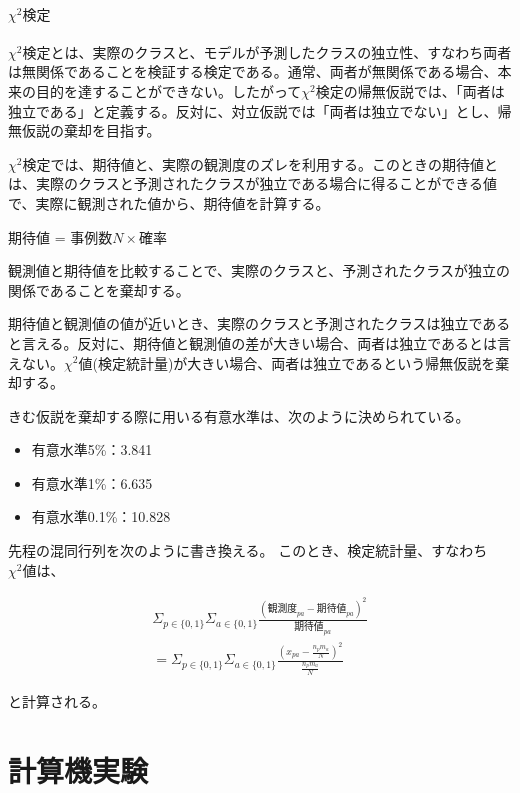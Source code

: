 \documentclass[dvipdfmx]{jsarticle}
\begin{document}
\paragraph{$χ^{2}検定$} \par
$χ^{2}検定$とは、実際のクラスと、モデルが予測したクラスの独立性、すなわち両者は無関係であることを検証する検定である。通常、両者が無関係である場合、本来の目的を達することができない。したがって$χ^{2}検定$の帰無仮説では、「両者は独立である」と定義する。反対に、対立仮説では「両者は独立でない」とし、帰無仮説の棄却を目指す。\par
$χ^{2}検定$では、期待値と、実際の観測度のズレを利用する。このときの期待値とは、実際のクラスと予測されたクラスが独立である場合に得ることができる値で、実際に観測された値から、期待値を計算する。
\begin{center}
  期待値 = 事例数$N\times$確率
\end{center}
観測値と期待値を比較することで、実際のクラスと、予測されたクラスが独立の関係であることを棄却する。\par
期待値と観測値の値が近いとき、実際のクラスと予測されたクラスは独立であると言える。反対に、期待値と観測値の差が大きい場合、両者は独立であるとは言えない。$χ^{2}値$(検定統計量)が大きい場合、両者は独立であるという帰無仮説を棄却する。\par
きむ仮説を棄却する際に用いる有意水準は、次のように決められている。
\begin{itemize}
  \item 有意水準5\%：3.841
  \item 有意水準1\%：6.635
  \item 有意水準0.1\%：10.828
\end{itemize}
先程の混同行列を次のように書き換える。
このとき、検定統計量、すなわち$χ^{2}値$は、
\begin{center}
  \begin{align*}
    \Sigma_{p \in \{0,1\}}\Sigma_{a \in \{0,1\}}\frac{(観測度_{pa}-期待値_{pa})^{2}}{期待値_{pa}}　\\
     = \Sigma_{p \in \{0,1\}}\Sigma_{a\in \{0,1\}}\frac{(x_{pa}-\frac{n_{p}m_{a}}{N})^{2}}{\frac{n_{p}m_{a}}{N}}
  \end{align*}
\end{center}
と計算される。





\section{計算機実験}
\end{document}
